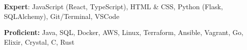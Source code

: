  \textbf{Expert}: JavaScript (React, TypeScript), HTML \& CSS, Python (Flask, SQLAlchemy), Git/Terminal, VSCode

 \textbf{Proficient:} Java, SQL, Docker, AWS, Linux, Terraform, Ansible, Vagrant, Go, Elixir, Crystal, C, Rust
